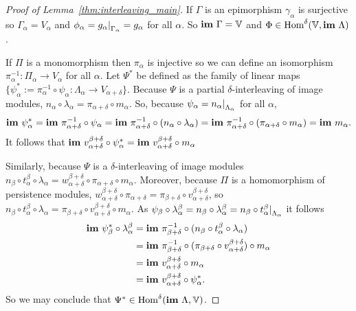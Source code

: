 \begin{proof}[Proof of Lemma~\ref{thm:interleaving_main}]
  If $\Gamma$ is an epimorphism $\gamma_\alpha$ is surjective so $\Gamma_\alpha = V_\alpha$ and $\phi_{\alpha} = g_{\alpha}\mathord{\mid}_{\Gamma_\alpha} = g_\alpha$ for all $\alpha$.
  So $\mathbf{im}~\Gamma = \mathbb{V}$ and $\Phi\in\mathrm{Hom}^\delta(\mathbb{V},\mathbf{im}~\Lambda)$.

  If $\Pi$ is a monomorphism then $\pi_\alpha$ is injective so we can define an isomorphism $\pi_\alpha^{-1} : \Pi_\alpha\to V_\alpha$ for all $\alpha$.
  Let $\Psi^*$ be defined as the family of linear maps $\{\psi_\alpha^* := \pi^{-1}_\alpha \circ \psi_\alpha : \Lambda_\alpha\to V_{\alpha+\delta}\}$.
  Because $\Psi$ is a partial $\delta$-interleaving of image modules, $n_\alpha\circ\lambda_\alpha = \pi_{\alpha+\delta}\circ m_\alpha$.
  So, because $\psi_\alpha = n_\alpha\mathord{\mid}_{\Lambda_\alpha}$ for all $\alpha$,
  \begin{align*}
    \mathbf{im}~\psi_\alpha^* = \mathbf{im}~\pi^{-1}_{\alpha+\delta}\circ\psi_\alpha = \mathbf{im}~\pi^{-1}_{\alpha+\delta}\circ (n_\alpha\circ\lambda_\alpha) = \mathbf{im}~\pi^{-1}_{\alpha+\delta}\circ (\pi_{\alpha+\delta}\circ m_\alpha) = \mathbf{im}~ m_\alpha.
  \end{align*}
  It follows that $\mathbf{im}~v_{\alpha+\delta}^{\beta+\delta}\circ\psi_\alpha^* = \mathbf{im}~v_{\alpha+\delta}^{\beta+\delta}\circ m_\alpha$

  Similarly, because $\Psi$ is a $\delta$-interleaving of image modules $n_\beta\circ t_\alpha^\beta\circ \lambda_\alpha = w_{\alpha+\delta}^{\beta+\delta}\circ\pi_{\alpha+\delta}\circ m_\alpha$.
  Moreover, because $\Pi$ is a homomorphism of persistence modules, $w_{\alpha+\delta}^{\beta+\delta}\circ\pi_{\alpha+\delta} = \pi_{\beta+\delta}\circ v_{\alpha+\delta}^{\beta+\delta}$, so $n_\beta\circ t_\alpha^\beta\circ \lambda_\alpha = \pi_{\beta+\delta}\circ v_{\alpha+\delta}^{\beta+\delta}\circ m_\alpha.$
  As $\psi_\beta\circ\lambda_\alpha^\beta = n_\beta\circ\lambda_\alpha^\beta = n_\beta\circ t_\alpha^\beta\mathord{\mid}_{\Lambda_\alpha}$ it follows
  \begin{align*}
    \mathbf{im}~\psi_\beta^*\circ\lambda_\alpha^\beta &= \mathbf{im}~\pi^{-1}_{\beta+\delta}\circ (n_\beta\circ t_\alpha^\beta\circ\lambda_\alpha)\\
      &= \mathbf{im}~\pi^{-1}_{\beta+\delta}\circ (\pi_{\beta+\delta}\circ v_{\alpha+\delta}^{\beta+\delta})\circ m_\alpha\\
      &= \mathbf{im}~v_{\alpha+\delta}^{\beta+\delta}\circ m_\alpha\\
      &= \mathbf{im}~v_{\alpha+\delta}^{\beta+\delta}\circ\psi_\alpha^*.
  \end{align*}
  So we may conclude that $\Psi^*\in\mathrm{Hom}^\delta(\mathbf{im}~\Lambda,\mathbb{V})$.


\end{proof}
